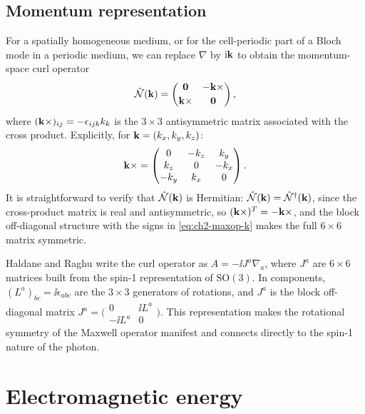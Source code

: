 \subsection{Momentum representation}
\label{sec:ch2-momentum}

For a spatially homogeneous medium, or for the cell-periodic part of a
Bloch mode in a periodic medium, we can replace $\nabla$ by
$\mathrm{i}\mathbf{k}$ to obtain the momentum-space curl operator
\begin{equation}\label{eq:ch2-maxop-k}
  \hat{\mathcal{N}}(\mathbf{k})
  =
  \begin{pmatrix}
    \mathbf{0} & -\mathbf{k}\times \\[2pt]
    \mathbf{k}\times & \mathbf{0}
  \end{pmatrix},
\end{equation}
where $(\mathbf{k}\times)_{ij}=-\epsilon_{ijk}k_k$ is the $3\times 3$
antisymmetric matrix associated with the cross product.  Explicitly, for
$\mathbf{k}=(k_x,k_y,k_z)$:
\begin{equation}\label{eq:ch2-cross-matrix}
  \mathbf{k}\times
  =
  \begin{pmatrix}
    0 & -k_z & k_y \\
    k_z & 0 & -k_x \\
    -k_y & k_x & 0
  \end{pmatrix}.
\end{equation}
It is straightforward to verify that $\hat{\mathcal{N}}(\mathbf{k})$ is Hermitian:
$\hat{\mathcal{N}}(\mathbf{k})=\hat{\mathcal{N}}^\dagger(\mathbf{k})$, since the cross-product matrix
is real and antisymmetric, so $(\mathbf{k}\times)^T=-\mathbf{k}\times$, and the
block off-diagonal structure with the signs in \eqref{eq:ch2-maxop-k}
makes the full $6\times6$ matrix symmetric.

\begin{remark}
Haldane and Raghu write the curl operator as $A=-\ii J^a\nabla_a$,
where $J^a$ are $6\times6$ matrices built from the spin-1
representation of $\mathrm{SO}(3)$.  In components,
$(L^a)_{bc}=\ii\epsilon_{abc}$ are the $3\times3$ generators of
rotations, and $J^a$ is the block off-diagonal matrix
$J^a = \bigl(\begin{smallmatrix}0 & \ii L^a \\ -\ii L^a &
0\end{smallmatrix}\bigr)$.  This representation makes the rotational
symmetry of the Maxwell operator manifest and connects directly to the
spin-1 nature of the photon.
\end{remark}


\section{Electromagnetic energy}
\label{sec:ch2-energy}

